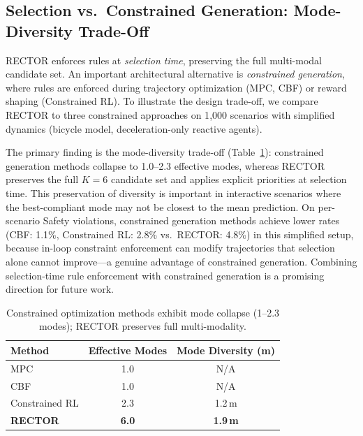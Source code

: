 \subsection{Selection vs.\ Constrained Generation: Mode-Diversity Trade-Off}
\label{subsec:constrained_baselines}

RECTOR enforces rules at \emph{selection time}, preserving the full multi-modal candidate set.  An important architectural alternative is \emph{constrained generation}, where rules are enforced during trajectory optimization (MPC, CBF) or reward shaping (Constrained RL).  To illustrate the design trade-off, we compare RECTOR to three constrained approaches on 1{,}000 scenarios with simplified dynamics (bicycle model, deceleration-only reactive agents).

The primary finding is the mode-diversity trade-off (Table~\ref{tab:mode_diversity}): constrained generation methods collapse to 1.0--2.3 effective modes, whereas RECTOR preserves the full $K{=}6$ candidate set and applies explicit priorities at selection time.  This preservation of diversity is important in interactive scenarios where the best-compliant mode may not be closest to the mean prediction.  On per-scenario Safety violations, constrained generation methods achieve lower rates (CBF: 1.1\%, Constrained RL: 2.8\% vs.\ RECTOR: 4.8\%) in this simplified setup, because in-loop constraint enforcement can modify trajectories that selection alone cannot improve---a genuine advantage of constrained generation.  Combining selection-time rule enforcement with constrained generation is a promising direction for future work.

\begin{table}[t]
\centering
\caption{Mode Diversity: Effective Modes and Coverage}
\label{tab:mode_diversity}
\begin{tabular}{lcc}
\toprule
\textbf{Method} & \textbf{Effective Modes} & \textbf{Mode Diversity (m)} \\
\midrule
MPC & 1.0 & N/A \\
CBF & 1.0 & N/A \\
Constrained RL & 2.3 & 1.2\,m \\
\textbf{RECTOR} & \textbf{6.0} & \textbf{1.9\,m} \\
\bottomrule
\end{tabular}
\vspace{1mm}
\caption*{\footnotesize Constrained optimization methods exhibit mode collapse (1--2.3 modes); RECTOR preserves full multi-modality.}
\end{table}

